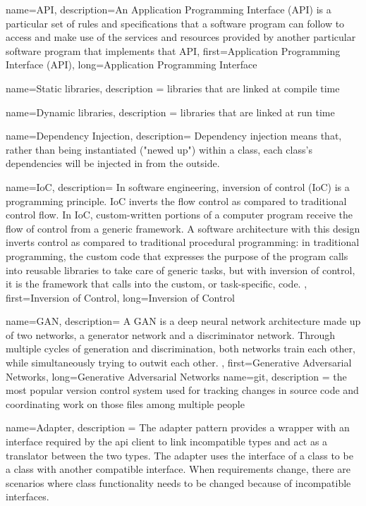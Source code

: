 {
   name={API},
   description={An Application Programming Interface (API) is a particular set
           of rules and specifications that a software program can follow to access and make use of the services and resources provided by another particular software program that implements that API},
   first={Application Programming Interface (API)},
   long={Application Programming Interface}
}

{
	name={Static libraries},
	description ={
			libraries that are linked at compile time
	}
}

{
	name={Dynamic libraries},
	description ={
			libraries that are linked at run time
	}
}


{
	name={Dependency Injection},
	description={
		Dependency injection means that, rather than being instantiated ("newed up") within a class, each class's dependencies will be injected in from the outside.
	}
}

{
	name={IoC},
	description={
		In software engineering, inversion of control (IoC) is a programming principle. IoC inverts the flow control as compared to traditional control flow. In IoC, custom-written portions of a computer program receive the flow of control from a generic framework. A software architecture with this design inverts control as compared to traditional procedural programming: in traditional programming, the custom code that expresses the purpose of the program calls into reusable libraries to take care of generic tasks, but with inversion of control, it is the framework that calls into the custom, or task-specific, code.
	},
	first={Inversion of Control},
	long={Inversion of Control}
}

{
	name={GAN},
	description={
		A GAN is a deep neural network architecture made up of two networks, a generator network and a discriminator network. Through multiple cycles of generation and discrimination, both networks train each other, while simultaneously trying to outwit each other.
	},
	first={Generative Adversarial Networks},
	long={Generative Adversarial Networks}
}
{
	name={git},
	description ={
			the most popular version control system used for tracking changes in source code and coordinating work on those files among multiple people
	}
}



{
	name={Adapter},
	description ={
		The adapter pattern provides a wrapper with an interface
		required by the \gls{api} client to link incompatible types and act as a
		translator between the two types. The adapter uses the interface
		of a class to be a class with another compatible interface. When
		requirements change, there are scenarios where class
		functionality needs to be changed because of incompatible
		interfaces.
	}
}


